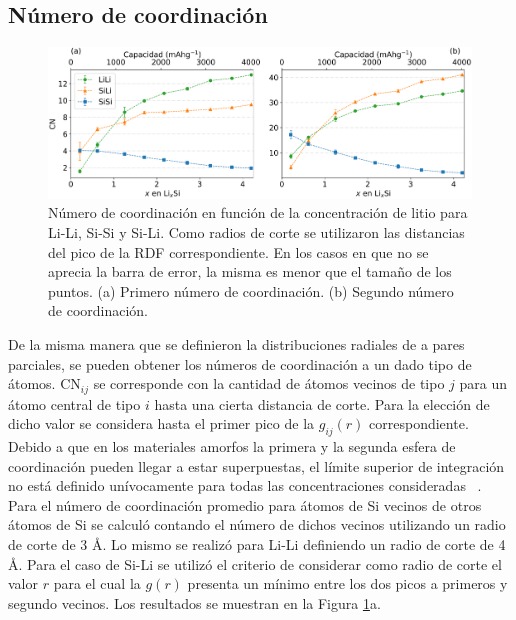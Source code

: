 \subsection{Número de coordinación}

\begin{figure}[h]
    \centering
    \includegraphics[width=\textwidth]{Silicio/caracterizacion/resultados/cn/cn.png}
    \caption{Número de coordinación en función de la concentración de litio para
    Li-Li, Si-Si y Si-Li. Como radios de corte se utilizaron las distancias 
    del pico de la RDF correspondiente. En los casos en que no se aprecia la barra
    de error, la misma es menor que el tamaño de los puntos. (a) Primero número 
    de coordinación. (b) Segundo número de coordinación.}
    \label{fig:cn}
\end{figure}

De la misma manera que se definieron la distribuciones radiales de a pares parciales,
se pueden obtener los números de coordinación a un dado tipo de átomos. CN$_{ij}$
se corresponde con la cantidad de átomos vecinos de tipo $j$ para un átomo central
de tipo $i$ hasta una cierta distancia de corte. Para la elección de dicho valor 
se considera hasta el primer pico de la $g_{ij}(r)$ correspondiente. Debido a que 
en los materiales amorfos la primera y la segunda esfera de coordinación pueden 
llegar a estar superpuestas, el límite superior de integración no está definido 
unívocamente para todas las concentraciones consideradas ~\cite{lamparter1995}.
Para el número de coordinación promedio para átomos de Si vecinos de otros átomos 
de Si se calculó contando el número de dichos vecinos utilizando un radio de 
corte de 3 \AA. Lo mismo se realizó para Li-Li definiendo un radio de corte de 
4 \AA. Para el caso de Si-Li se utilizó el criterio de considerar como radio de 
corte el valor $r$ para el cual la $g(r)$ presenta un mínimo entre los dos picos
a primeros y segundo vecinos. Los resultados se muestran en la Figura 
\ref{fig:cn}a.


